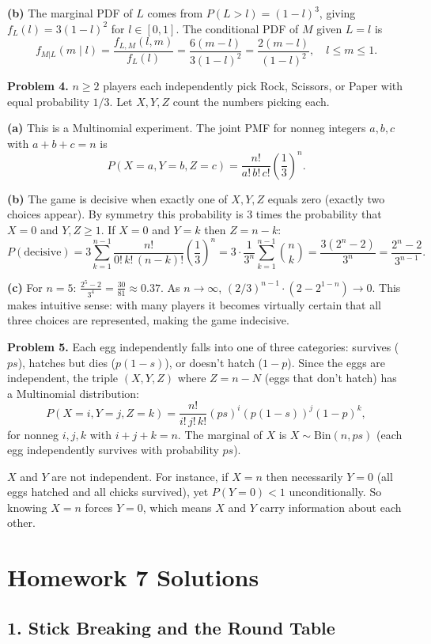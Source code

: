 \documentclass{article}
\begin{document}
\textbf{(b)} The marginal PDF of $L$ comes from $P(L>l)=(1-l)^3$, giving $f_L(l)=3(1-l)^2$ for $l\in[0,1]$. The conditional PDF of $M$ given $L=l$ is
$$
f_{M|L}(m\mid l) = \frac{f_{L,M}(l,m)}{f_L(l)} = \frac{6(m-l)}{3(1-l)^2} = \frac{2(m-l)}{(1-l)^2}, \quad l\le m\le1.
$$

\bigskip
\textbf{Problem 4.} $n\ge2$ players each independently pick Rock, Scissors, or Paper with equal probability $1/3$. Let $X,Y,Z$ count the numbers picking each.

\textbf{(a)} This is a Multinomial experiment. The joint PMF for nonneg integers $a,b,c$ with $a+b+c=n$ is
$$
P(X=a,Y=b,Z=c) = \frac{n!}{a!\,b!\,c!}\left(\frac{1}{3}\right)^n.
$$

\textbf{(b)} The game is decisive when exactly one of $X,Y,Z$ equals zero (exactly two choices appear). By symmetry this probability is $3$ times the probability that $X=0$ and $Y,Z\ge1$. If $X=0$ and $Y=k$ then $Z=n-k$:
$$
P(\text{decisive}) = 3\sum_{k=1}^{n-1}\frac{n!}{0!\,k!\,(n-k)!}\left(\frac{1}{3}\right)^n = 3\cdot\frac{1}{3^n}\sum_{k=1}^{n-1}\binom{n}{k} = \frac{3(2^n-2)}{3^n} = \frac{2^n-2}{3^{n-1}}.
$$

\textbf{(c)} For $n=5$: $\frac{2^5-2}{3^4} = \frac{30}{81}\approx0.37$. As $n\to\infty$, $(2/3)^{n-1}\cdot(2-2^{1-n})\to0$. This makes intuitive sense: with many players it becomes virtually certain that all three choices are represented, making the game indecisive.

\bigskip
\textbf{Problem 5.} Each egg independently falls into one of three categories: survives ($ps$), hatches but dies ($p(1-s)$), or doesn't hatch ($1-p$). Since the eggs are independent, the triple $(X,Y,Z)$ where $Z=n-N$ (eggs that don't hatch) has a Multinomial distribution:
$$
P(X=i,Y=j,Z=k) = \frac{n!}{i!\,j!\,k!}(ps)^i(p(1-s))^j(1-p)^k,
$$
for nonneg $i,j,k$ with $i+j+k=n$. The marginal of $X$ is $X\sim\text{Bin}(n,ps)$ (each egg independently survives with probability $ps$).

$X$ and $Y$ are not independent. For instance, if $X=n$ then necessarily $Y=0$ (all eggs hatched and all chicks survived), yet $P(Y=0)<1$ unconditionally. So knowing $X=n$ forces $Y=0$, which means $X$ and $Y$ carry information about each other.

\bigskip
\section*{Homework 7 Solutions}

\subsection*{1. Stick Breaking and the Round Table}
\end{document}
